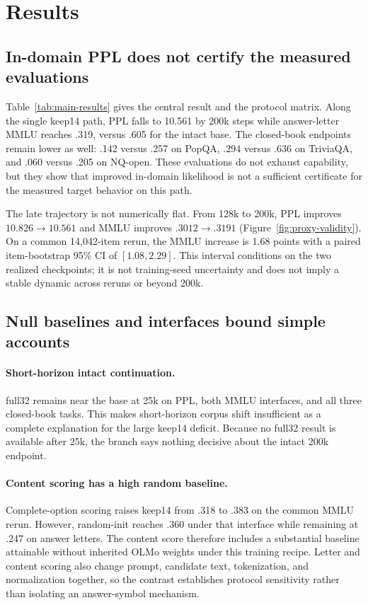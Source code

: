 \section{Results}
\label{sec:experiments}

\subsection{In-domain PPL does not certify the measured evaluations}


Table~\ref{tab:main-results} gives the central result and the protocol matrix.
Along the single keep14 path, PPL falls to 10.561 by 200k steps while
answer-letter MMLU reaches .319, versus .605 for the intact base. The
closed-book endpoints remain lower as well: .142 versus .257 on PopQA, .294
versus .636 on TriviaQA, and .060 versus .205 on NQ-open. These evaluations do
not exhaust capability, but they show that improved in-domain likelihood is
not a sufficient certificate for the measured target behavior on this path.

The late trajectory is not numerically flat. From 128k to 200k, PPL improves
$10.826\!\rightarrow\!10.561$ and MMLU improves
$.3012\!\rightarrow\!.3191$ (Figure~\ref{fig:proxy-validity}). On a common
14,042-item rerun, the MMLU increase is 1.68 points with a paired item-bootstrap
95\% CI of $[1.08,2.29]$. This interval conditions on the two realized
checkpoints; it is not training-seed uncertainty and does not imply a stable
dynamic across reruns or beyond 200k.

\subsection{Null baselines and interfaces bound simple accounts}
\paragraph{Short-horizon intact continuation.}
full32 remains near the base at 25k on PPL, both MMLU interfaces, and all three
closed-book tasks. This makes short-horizon corpus shift insufficient as a
complete explanation for the large keep14 deficit. Because no full32 result is
available after 25k, the branch says nothing decisive about the intact 200k
endpoint.

\paragraph{Content scoring has a high random baseline.}
Complete-option scoring raises keep14 from .318 to .383 on the common MMLU
rerun. However, random-init reaches .360 under that interface while remaining
at .247 on answer letters. The content score therefore includes a substantial
baseline attainable without inherited OLMo weights under this training recipe.
Letter and content scoring also change prompt, candidate text, tokenization,
and normalization together, so the contrast establishes protocol sensitivity
rather than isolating an answer-symbol mechanism.

